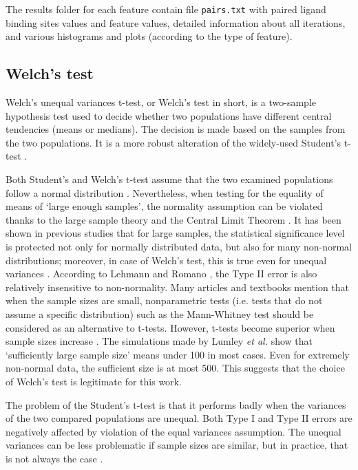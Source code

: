The results folder for each feature contain file \texttt{pairs.txt} with paired ligand binding sites values and feature values, detailed information about all iterations, and various histograms and plots (according to the type of feature). 


\subsection{Welch's test}

Welch's unequal variances t-test, or Welch's test in short, is a two-sample hypothesis test used to decide whether two populations have different central tendencies (means or medians). The decision is made based on the samples from the two populations. It is a more robust alteration of the widely-used Student's t-test \cite{welch}.

Both Student's and Welch's t-test assume that the two examined populations follow a normal distribution \cite{welch}. Nevertheless, when testing for the equality of means of `large enough samples', the normality assumption can be violated thanks to the large sample theory and the Central Limit Theorem \cite{lehmann}. It has been shown in previous studies that for large samples, the statistical significance level is protected not only for normally distributed data, but also for many non-normal distributions; moreover, in case of Welch's test, this is true even for unequal variances \cite{zimmerman_zumbo_1993, zumbo_coulombe_1997, lumley}. According to  Lehmann and Romano \cite{lehmann}, the Type II error is also relatively insensitive to non-normality. Many articles and textbooks mention that when the sample sizes are small, nonparametric tests (i.e. tests that do not assume a specific distribution) such as the Mann-Whitney test \cite{mann} should be considered as an alternative to t-tests.
However, t-tests become superior when sample sizes increase \cite{zimmerman1998, lumley}. The simulations made by Lumley \textit{et al.} \cite{lumley} show that `sufficiently large sample size' means under 100 in most cases. Even for extremely non-normal data, the sufficient size is at most 500. This suggests that the choice of Welch's test is legitimate for this work.

The problem of the Student's t-test is that it performs badly when the variances of the two compared populations are unequal. Both Type I and Type II errors are negatively affected by violation of the equal variances assumption. The unequal variances can be less problematic if sample sizes are similar, but in practice, that is not always the case \cite{ruxton}.

